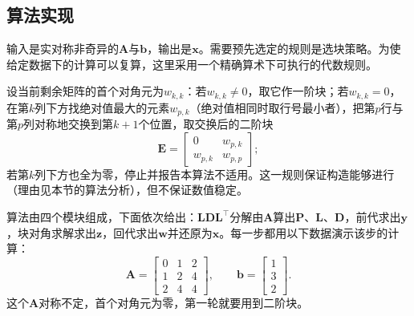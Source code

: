 \subsection{算法实现}
输入是实对称非奇异的$\bm A$与$\bm b$，输出是$\bm x$。需要预先选定的规则是选块策略。为使给定数据下的计算可以复算，这里采用一个精确算术下可执行的代数规则。

设当前剩余矩阵的首个对角元为$w_{k,k}$：若$w_{k,k}\neq0$，取它作一阶块；若$w_{k,k}=0$，在第$k$列下方找绝对值最大的元素$w_{p,k}$（绝对值相同时取行号最小者），把第$p$行与第$p$列对称地交换到第$k+1$个位置，取交换后的二阶块
\begin{equation}
 \bm E=\begin{bmatrix}0&w_{p,k}\\w_{p,k}&w_{p,p}\end{bmatrix};
 \label{eq:ls-ldlt-pivot-block}
\end{equation}
若第$k$列下方也全为零，停止并报告本算法不适用。这一规则保证构造能够进行（理由见本节的算法分析），但不保证数值稳定。

算法由四个模块组成，下面依次给出：$\bm L\bm D\bm L^\top$分解由$\bm A$算出$\bm P$、$\bm L$、$\bm D$，前代求出$\bm y$，块对角求解求出$\bm z$，回代求出$\bm w$并还原为$\bm x$。每一步都用以下数据演示该步的计算：
\[
 \bm A=\begin{bmatrix}0&1&2\\1&2&4\\2&4&4\end{bmatrix},\qquad
 \bm b=\begin{bmatrix}1\\3\\2\end{bmatrix}.
\]
这个$\bm A$对称不定，首个对角元为零，第一轮就要用到二阶块。


